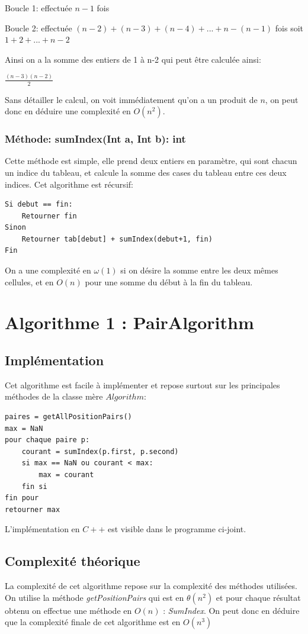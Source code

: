 \documentclass[a4paper, 12pt]{article}
\begin{document}
Boucle 1: effectuée $n-1$ fois

Boucle 2: effectuée $(n-2) + (n-3) + (n-4) + ... + n-(n-1)$ fois
soit $1 + 2 + ... + n-2$

Ainsi on a la somme des entiers de 1 à n-2 qui peut être calculée ainsi:

\begin {center}
$\frac{(n-3)(n-2)}{2}$
\end{center}

Sans détailler le calcul, on voit immédiatement qu'on a un produit de $n$, on peut donc en déduire une complexité en $O(n^2)$.

\subsubsection{Méthode: sumIndex(Int a, Int b): int}
Cette méthode est simple, elle prend deux entiers en paramètre, qui sont chacun un indice du tableau, et calcule la somme des cases du tableau entre ces deux indices. Cet algorithme est récursif:
\begin{verbatim}
Si debut == fin:
    Retourner fin
Sinon 
    Retourner tab[debut] + sumIndex(debut+1, fin)
Fin
\end{verbatim}
On a une complexité en $\omega(1)$ si on désire la somme entre les deux mêmes cellules, et en $O(n)$ pour une somme du début à la fin du tableau.
\section{Algorithme 1 : PairAlgorithm}
\subsection{Implémentation}
Cet algorithme est facile à implémenter et repose surtout sur les principales méthodes de la classe mère $Algorithm$:
\begin{verbatim}
paires = getAllPositionPairs()
max = NaN
pour chaque paire p:
    courant = sumIndex(p.first, p.second)
    si max == NaN ou courant < max:
        max = courant
    fin si
fin pour
retourner max
\end{verbatim}
L'implémentation en $C++$ est visible dans le programme ci-joint.
\subsection{Complexité théorique}
La complexité de cet algorithme repose sur la complexité des méthodes utilisées. 
On utilise la méthode \emph{getPositionPairs} qui est en $\theta(n^2)$ et pour chaque résultat obtenu on effectue une méthode en $O(n)$  : \emph{SumIndex}.
On peut donc en déduire que la complexité finale de cet algorithme est en $O(n^3)$
\end{document}
